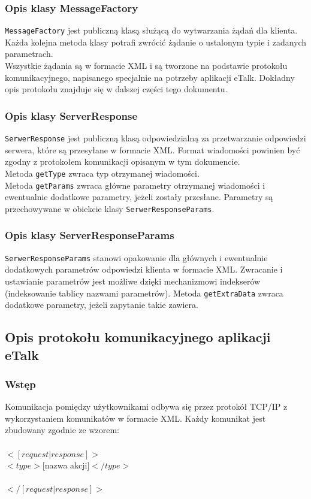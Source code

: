 \documentclass[a4paper,12pt]{article}
\begin{document}
\subsubsection[Opis klasy MessageFactory]{Opis klasy MessageFactory}
\texttt{MessageFactory} jest publiczną klasą służącą do wytwarzania żądań dla klienta.\\
Każda kolejna metoda klasy potrafi zwrócić żądanie o ustalonym typie i zadanych parametrach.\\
Wszystkie żądania są w formacie XML i są tworzone na podstawie protokołu komunikacyjnego, napisanego specjalnie na potrzeby aplikacji eTalk. Dokładny opis protokołu znajduje się w dalszej części tego dokumentu.

\subsubsection[Opis klasy ServerResponse]{Opis klasy ServerResponse}
\texttt{SerwerResponse} jest publiczną klasą odpowiedzialną za przetwarzanie odpowiedzi serwera, które są przesyłane w formacie XML.
Format wiadomości powinien być zgodny z protokołem komunikacji opisanym w tym dokumencie.\\
Metoda \texttt{getType} zwraca typ otrzymanej wiadomości.\\
Metoda \texttt{getParams} zwraca główne parametry otrzymanej wiadomości i ewentualnie dodatkowe parametry, jeżeli zostały przesłane. Parametry są przechowywane w obiekcie klasy \texttt{SerwerResponseParams}.

\subsubsection[Opis klasy ServerResponseParams]{Opis klasy ServerResponseParams}
\texttt{SerwerResponseParams} stanowi opakowanie dla głównych i ewentualnie dodatkowych parametrów odpowiedzi klienta w formacie XML. Zwracanie i ustawianie parametrów jest możliwe dzięki mechanizmowi indekserów (indeksowanie tablicy nazwami parametrów).
Metoda \texttt{getExtraData} zwraca dodatkowe parametry, jeżeli zapytanie takie zawiera.

\subsection[Opis protokołu komunikacyjnego aplikacji eTalk]{Opis protokołu komunikacyjnego aplikacji eTalk}
\subsubsection[Wstęp]{Wstęp}
Komunikacja pomiędzy użytkownikami odbywa się przez protokół TCP/IP z wykorzystaniem
komunikatów w formacie XML. Każdy komunikat jest zbudowany zgodnie ze
wzorem:\\\\
\noindent  $<[request|response]>$\\
\indent    $<type>$[nazwa akcji]$</type>$\\
\\
$</[request|response]>$\\\\
\end{document}
